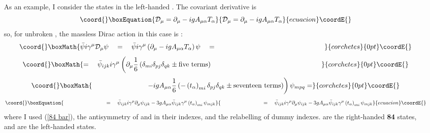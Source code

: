 \documentclass[a4paper,12pt,oneside]{article}
\begin{document}
As an example, I consider the states in the left-handed 
\coordHE{}.  The covariant derivative is \cite{Rosner}
\begin{equation}\coord{}\boxEquation{\label{covariant derivative}
\mathcal{D}_\mu = \partial_\mu - i g A_{\mu\alpha}T_\alpha
}{\mathcal{D}_\mu = \partial_\mu - i g A_{\mu\alpha}T_\alpha
}{ecuacion}\coordE{}\end{equation}
so, for unbroken \coordHE{}, the massless Dirac action in 
this case is \cite{Rosner}:
\begin{displaymath}\coord{}\boxMath{
\bar{\psi}i\gamma^\mu\mathcal{D}_\mu\psi\quad = \quad
\bar{\psi}i\gamma^\mu\left(\partial_\mu
- i g A_{\mu\alpha}T_\alpha\right)\psi\quad =
\qquad\qquad\qquad\qquad\qquad\qquad\qquad\qquad
}{corchetes}{0pt}\coordE{}\end{displaymath}
\begin{displaymath}\coord{}\boxMath{
=\quad\bar{\psi}_{ijk}i\gamma^\mu\left(\partial_\mu
\frac{1}{6}\left(\delta_{mi}\delta_{pj}\delta_{qk}\pm\textrm{five 
terms}\right)\right.
\qquad\qquad\qquad\qquad\qquad\qquad\qquad\qquad
}{corchetes}{0pt}\coordE{}\end{displaymath}
\begin{displaymath}\coord{}\boxMath{
\qquad\qquad\qquad\qquad
\left. - i g A_{\mu\alpha}\frac{1}{6}\left(-\left(t_\alpha
\right)_{mi}\delta_{pj}\delta_{qk}\pm\textrm{seventeen 
terms}\right)\right)\psi_{mpq} =
}{corchetes}{0pt}\coordE{}\end{displaymath}
\begin{equation}\coord{}\boxEquation{\label{massless Dirac action}
\qquad\qquad\qquad\qquad
=\quad\bar{\psi}_{ijk}i\gamma^\mu\partial_\mu\psi_{ijk}
- 3 g A_{\mu\alpha}\bar{\psi}_{ijk}\gamma^\mu \left(t_\alpha
\right)_{mi}\psi_{mjk}
}{\qquad\qquad\qquad\qquad
=\quad\bar{\psi}_{ijk}i\gamma^\mu\partial_\mu\psi_{ijk}
- 3 g A_{\mu\alpha}\bar{\psi}_{ijk}\gamma^\mu \left(t_\alpha
\right)_{mi}\psi_{mjk}
}{ecuacion}\coordE{}\end{equation}
where I used (\ref{84 bar}), the antisymmetry of \coordHE{}
and \coordHE{} in their indexes, and the relabelling of dummy 
indexes.
\coordHE{} are the right-handed \textbf{84} states, and
\coordHE{} are the left-handed \coordHE{} states.
\end{document}
